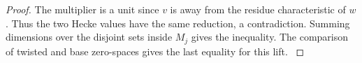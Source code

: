 \begin{proof}
The multiplier is a unit since \(v\) is away from the
residue characteristic of \(w\). Thus the two Hecke values
have the same reduction, a contradiction. Summing dimensions over the disjoint sets inside \(M_j\)
gives the inequality. The comparison of twisted and base
zero-spaces gives the last equality for this lift.
\label{cor:selected-cut-2}
\end{proof}


